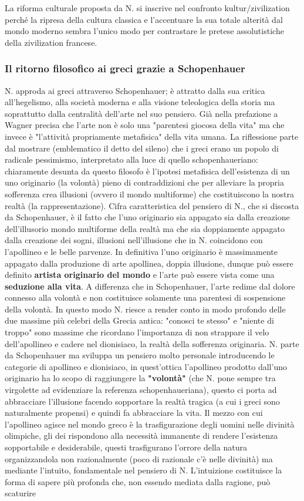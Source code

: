 \documentclass[10pt,a4paper]{article}
\begin{document}
La riforma culturale proposta da N. si inscrive nel confronto kultur/zivilization perché la ripresa della cultura classica e l'accentuare la sua totale alterità dal mondo moderno sembra l'unico modo per contrastare le pretese assolutistiche della zivilization francese.
\subsubsection{Il ritorno filosofico ai greci grazie a Schopenhauer}
N. approda ai greci attraverso Schopenhauer; è attratto dalla sua critica all'hegelismo, alla società moderna e alla visione teleologica della storia ma soprattutto dalla centralità dell'arte nel suo pensiero. Già nella prefazione a Wagner precisa che l'arte non è solo una "parentesi giocosa della vita" ma che invece è "l'attività propriamente metafisica" della vita umana. La riflessione parte dal mostrare (emblematico il detto del sileno) che i greci erano un popolo di radicale pessimismo, interpretato alla luce di quello schopenhaueriano: chiaramente desunta da questo filosofo è l'ipotesi metafisica dell'esistenza di un uno originario (la volontà) pieno di contraddizioni che per alleviare la propria sofferenza crea illusioni (ovvero il mondo multiforme) che costituiscono la nostra realtà (la rappresentazione). Cifra caratteristica del pensiero di N., che si discosta da Schopenhauer, è il fatto che l'uno originario sia appagato sia dalla creazione dell'illusorio mondo multiforme della realtà ma che sia doppiamente appagato dalla creazione dei sogni, illusioni nell'illusione che in N. coincidono con l'apollineo e le belle parvenze. In definitiva l'uno originario è massimamente appagato dalla produzione di arte apollinea, doppia illusione, dunque può essere definito \textbf{artista originario del mondo} e l'arte può essere vista come una \textbf{seduzione alla vita}. A differenza che in Schopenhauer, l'arte redime dal dolore connesso alla volontà e non costituisce solamente una parentesi di sospensione della volontà. In questo modo N. riesce a render conto in modo profondo delle due massime più celebri della Grecia antica: "conosci te stesso" e "niente di troppo" sono massime che ricordano l'importanza di non strappare il velo dell'apollineo e cadere nel dionisiaco, la realtà della sofferenza originaria.  N. parte da Schopenhauer ma sviluppa un pensiero molto personale introducendo le categorie di apollineo e dionisiaco, in quest'ottica l'apollineo prodotto dall'uno originario ha lo scopo di raggiungere la \textbf{"volontà"} (che N. pone sempre tra virgolette ad evidenziare la referenza schopenhaueriana), questo ci porta ad abbracciare l'illusione facendo sopportare la realtà tragica (a cui i greci sono naturalmente propensi) e quindi fa abbracciare la vita. Il mezzo con cui l'apollineo agisce nel mondo greco è la trasfigurazione degli uomini nelle divinità olimpiche, gli dei rispondono alla necessità immanente di rendere l'esistenza sopportabile e desiderabile, questi trasfigurano l'orrore della natura organizzandola non razionalmente (poco di razionale c'è nelle divinità) ma mediante l'intuito, fondamentale nel pensiero di N. L'intuizione costituisce la forma di sapere più profonda che, non essendo mediata dalla ragione, può scaturire 
\end{document}
